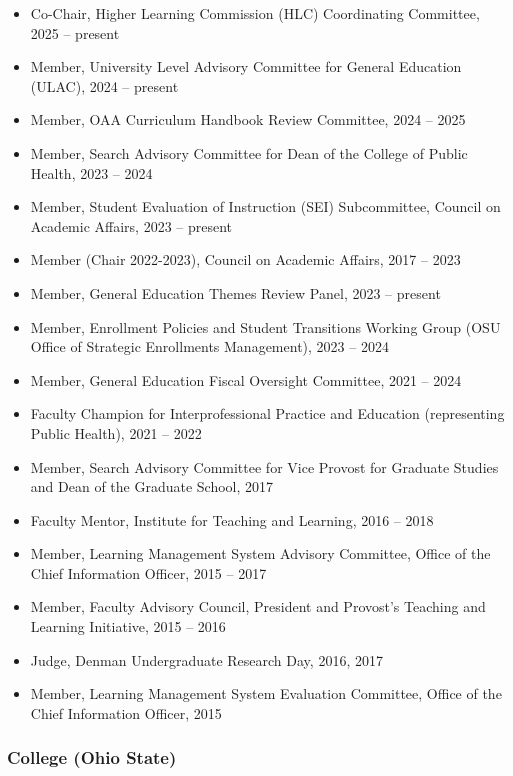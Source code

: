 \documentclass[
  english,
  letterpaper,
  DIV=11,
  numbers=noendperiod]{scrartcl}
\providecommand{\tightlist}{%
  \setlength{\itemsep}{0pt}\setlength{\parskip}{0pt}}
\begin{document}
\begin{itemize}
\tightlist
\item
  Co-Chair, Higher Learning Commission (HLC) Coordinating Committee,
  2025 -- present
\item
  Member, University Level Advisory Committee for General Education
  (ULAC), 2024 -- present
\item
  Member, OAA Curriculum Handbook Review Committee, 2024 -- 2025
\item
  Member, Search Advisory Committee for Dean of the College of Public
  Health, 2023 -- 2024
\item
  Member, Student Evaluation of Instruction (SEI) Subcommittee, Council
  on Academic Affairs, 2023 -- present
\item
  Member (Chair 2022-2023), Council on Academic Affairs, 2017 -- 2023
\item
  Member, General Education Themes Review Panel, 2023 -- present
\item
  Member, Enrollment Policies and Student Transitions Working Group (OSU
  Office of Strategic Enrollments Management), 2023 -- 2024
\item
  Member, General Education Fiscal Oversight Committee, 2021 -- 2024
\item
  Faculty Champion for Interprofessional Practice and Education
  (representing Public Health), 2021 -- 2022
\item
  Member, Search Advisory Committee for Vice Provost for Graduate
  Studies and Dean of the Graduate School, 2017
\item
  Faculty Mentor, Institute for Teaching and Learning, 2016 -- 2018
\item
  Member, Learning Management System Advisory Committee, Office of the
  Chief Information Officer, 2015 -- 2017
\item
  Member, Faculty Advisory Council, President and Provost's Teaching and
  Learning Initiative, 2015 -- 2016
\item
  Judge, Denman Undergraduate Research Day, 2016, 2017
\item
  Member, Learning Management System Evaluation Committee, Office of the
  Chief Information Officer, 2015
\end{itemize}

\subsubsection{College (Ohio State)}\label{college-ohio-state}
\end{document}
